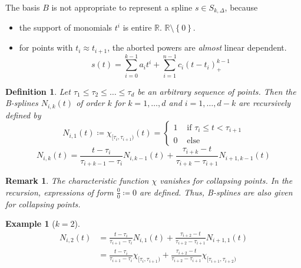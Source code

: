 \documentclass[a4paper]{article}
\newcounter{lecref}[section]
\numberwithin{lecref}{section}
\theoremstyle{break}
\newtheorem{example}[lecref]{Example}
\newtheorem{definition}[lecref]{Definition}
\newtheorem*{Remark}{Remark}
\newcommand{\Set}[1]{\left\{#1\right\}}
\begin{document}
The basis $B$ is not appropriate to represent a spline $s \in S_{k,\Delta}$, because
\begin{itemize}
  \item the support of monomials $t^i$ is entire $\mathbb R$. $\mathbb R \setminus \Set{0}$.
  \item for points with $t_i \approx t_{i+1}$, the aborted powers are \emph{almost} linear dependent.
    \[ s(t) = \sum_{i=0}^{k-1} a_i t^i + \sum_{i=1}^{n-1} c_i (t - t_i)_+^{k-1} \]
\end{itemize}

\begin{definition}
  \label{definition:4-21}
  Let $\tau_1 \leq \tau_2 \leq \dots \leq \tau_d$ be an arbitrary sequence of points.
  Then the B-splines $N_{i,k}(t)$ of order $k$ for $k = 1, \dots, d$ and $i = 1, \dots, d-k$
  are recursively defined by
  \[
    N_{i,1}(t) \coloneqq \chi_{[\tau_i,\tau_{i+1})}(t) = \begin{cases}
      1 & \text{ if } \tau_i \leq t < \tau_{i+1} \\
      0 & \text{ else}
    \end{cases}
  \] \[
    N_{i,k}(t) = \frac{t - \tau_i}{\tau_{i+k-1} - \tau_i} N_{i,k-1}(t) + \frac{\tau_{i+k} - t}{\tau_{i+k} - \tau_{i+1}} N_{i+1,k-1}(t)
  \]
\end{definition}

\begin{Remark}
  The characteristic function $\chi$ vanishes for collapsing points.
  In the recursion, expressions of form $\frac00 \coloneqq 0$ are defined.
  Thus, B-splines are also given for collapsing points.
\end{Remark}

\begin{example}[$k=2$]
  \begin{align*}
    N_{i,2}(t) &= \frac{t - \tau_i}{\tau_{i+1} - \tau_i} N_{i,1}(t) + \frac{\tau_{i+2} - t}{\tau_{i+2} - \tau_{i+1}} N_{i+1,1}(t) \\
      &= \frac{t - \tau_i}{\tau_{i+1} - \tau_i} \chi_{[\tau_i,\tau_{i+1})} + \frac{\tau_{i+2} - t}{\tau_{i+2} - \tau_{i+1}} \chi_{[\tau_{i+1},\tau_{i+2})}
  \end{align*}
\end{example}
\end{document}
